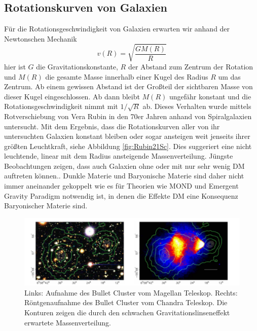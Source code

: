 \subsection*{Rotationskurven von Galaxien}
Für die Rotationsgeschwindigkeit von Galaxien erwarten wir anhand der Newtonschen Mechanik
\begin{equation}
v(R) = \sqrt{\frac{GM(R)}{R}}
\label{eq:Keppler}
\end{equation}
hier ist $G$ die Gravitationskonstante, $R$ der Abstand zum Zentrum der Rotation und $M(R)$ die gesamte Masse innerhalb einer Kugel des Radius $R$ um das Zentrum.  
Ab einem gewissen Abstand ist der Großteil der sichtbaren Masse von dieser Kugel eingeschlossen.
Ab dann bleibt $M(R)$ ungefähr konstant und die Rotationsgeschwindigkeit nimmt mit $1/\sqrt{R}$ ab.
Dieses Verhalten wurde mittels Rotverschiebung von Vera Rubin in den 70er Jahren anhand von Spiralgalaxien untersucht.
Mit dem Ergebnis, dass die Rotationskurven aller von ihr untersuchten Galaxien konstant bleiben oder sogar ansteigen weit jenseits ihrer größten Leuchtkraft, siehe Abbildung \ref{fig:Rubin21Sc}.
Dies suggeriert eine nicht leuchtende, linear mit dem Radius ansteigende Massenverteilung.\cite{Rubin80}
Jüngste Beobachtungen zeigen, dass auch Galaxien ohne oder mit nur sehr wenig DM auftreten können.\cite{VanDokkum2018}.
Dunkle Materie und Baryonische Materie sind daher nicht immer aneinander gekoppelt wie es für Theorien wie \ac{MOND}\cite{1983ApJ...270..365M} und Emergent Gravity Paradigm\cite{Verlinde2016} notwendig ist, in denen die Effekte \ac{DM} eine Konsequenz Baryonischer Materie sind.

\begin{figure}[!b]
\begin{center}
\includegraphics[width=\textwidth]{./fig/Bullet.pdf}
\end{center}
\caption{Links: Aufnahme des Bullet Cluster vom Magellan Teleskop.
Rechts: Röntgenaufnahme des Bullet Cluster vom Chandra Teleskop.
Die Konturen zeigen die durch den schwachen Gravitationslinseneffekt erwartete Massenverteilung.\cite{Clowe2006}}
\label{fig:BulletC}
\end{figure}

